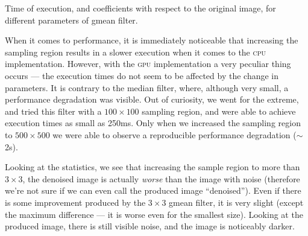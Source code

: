 \documentclass[12pt]{article}
\theoremstyle{definition}
\begin{document}
\begin{table}[H]\centering
    \caption{Time of execution, and coefficients with respect to the original image, for different parameters of gmean filter.}
\end{table}

When it comes to performance, it is immediately noticeable
that increasing the sampling region results in a slower execution when it comes to the \textsc{cpu} implementation.
However, with the \textsc{gpu} implementation a very peculiar thing occurs --- the execution times do not seem to be affected by the change in parameters.
It is contrary to the median filter, where, although very small, a performance degradation was visible.
Out of curiosity, we went for the extreme, and tried this filter with a $100\times100$ sampling region, and were able to achieve execution times as small as 250ms.
Only when we increased the sampling region to $500\times500$ we were able to observe a reproducible performance degradation ($\sim$2s).

Looking at the statistics, we see that increasing the sample region to more than $3\times3$,
the denoised image is actually \emph{worse} than the image with noise
(therefore we're not sure if we can even call the produced image ``denoised'').
Even if there is some improvement produced by the $3\times3$ gmean filter, it is very slight (except the maximum difference --- it is worse even for the smallest size).
Looking at the produced image, there is still visible noise, and the image is noticeably darker.
\end{document}
